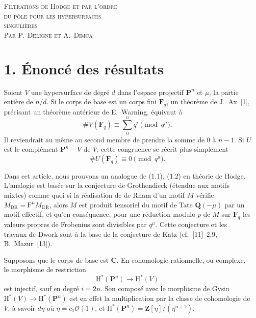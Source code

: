 \documentclass[12pt,a4paper]{article}
\theoremstyle{plain}
\theoremstyle{definition}
\begin{document}
\begin{center}
{\Large\scshape Filtrations de Hodge et par l'ordre}\\[4pt]
{\Large\scshape du pôle pour les hypersurfaces}\\[4pt]
{\Large\scshape singulières}\\[12pt]
{\scshape Par P.\ Deligne et A.\ Dimca}
\end{center}

\section*{1. Énoncé des résultats}

Soient $V$ une hypersurface de degré $d$ dans l'espace projectif $\mathbf{P}^n$ et $\mu$, la partie entière de $n/d$. Si le corps de base est un corps fini $\mathbf{F}_q$, un théorème de J.\ Ax~[1], précisant un théorème antérieur de E.\ Warning, équivaut à
\begin{equation}\label{eq:1.1}
\# V(\mathbf{F}_q) \equiv \sum_0^n q^i \pmod{q^\mu}.
\tag{1.1}
\end{equation}
Il reviendrait au même au second membre de prendre la somme de $0$ à $n-1$. Si $U$ est le complément $\mathbf{P}^n - V$ de $V$, cette congruence se récrit plus simplement
\begin{equation}\label{eq:1.2}
\# U(\mathbf{F}_q) \equiv 0 \pmod{q^\mu}.
\tag{1.2}
\end{equation}

Dans cet article, nous prouvons un analogue de (1.1), (1.2) en théorie de Hodge. L'analogie est basée sur la conjecture de Grothendieck (étendue aux motifs mixtes) comme quoi si la réalisation de de Rham d'un motif $M$ vérifie $M_{\mathrm{DR}} = \mathrm{F}^\mu M_{\mathrm{DR}}$, alors $M$ est produit tensoriel du motif de Tate $\mathbf{Q}(-\mu)$ par un motif effectif, et qu'en conséquence, pour une réduction modulo $p$ de $M$ sur $\mathbf{F}_q$ les valeurs propres de Frobenius sont divisibles par $q^\mu$. Cette conjecture et les travaux de Dwork sont à la base de la conjecture de Katz (cf.~[11]~2.9, B.~Mazur~[13]).

Supposons que le corps de base est $\mathbf{C}$. En cohomologie rationnelle, ou complexe, le morphisme de restriction
\[
\mathrm{H}^*(\mathbf{P}^n) \to \mathrm{H}^*(V)
\]
est injectif, sauf en degré $i = 2n$. Son composé avec le morphisme de Gysin $\mathrm{H}^*(V) \to \mathrm{H}^*(\mathbf{P}^n)$ est en effet la multiplication par la classe de cohomologie de $V$, à savoir $d\eta$ où $\eta = c_1 \mathscr{O}(1)$, et $\mathrm{H}^*(\mathbf{P}^n) = \mathbf{Z}[\eta]/(\eta^{n+1})$.
\end{document}
